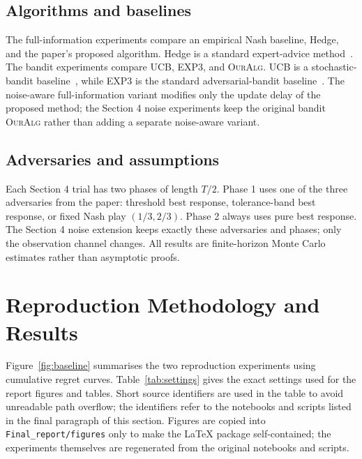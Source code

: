 \documentclass[a4paper,11pt]{article}
\theoremstyle{definition}
\newcommand{\OurAlg}{\textsc{OurAlg}}
\begin{document}
\subsection{Algorithms and baselines}

The full-information experiments compare an empirical Nash baseline, Hedge, and the paper's proposed algorithm. Hedge is a standard expert-advice method~\cite{freund1997decision,cesabianchi2006prediction}. The bandit experiments compare UCB, EXP3, and \OurAlg{}. UCB is a stochastic-bandit baseline~\cite{auer2002finite}, while EXP3 is the standard adversarial-bandit baseline~\cite{auer2002nonstochastic}. The noise-aware full-information variant modifies only the update delay of the proposed method; the Section 4 noise experiments keep the original bandit \OurAlg{} rather than adding a separate noise-aware variant.

\subsection{Adversaries and assumptions}

Each Section 4 trial has two phases of length $T/2$. Phase 1 uses one of the three adversaries from the paper: threshold best response, tolerance-band best response, or fixed Nash play $(1/3,2/3)$. Phase 2 always uses pure best response. The Section 4 noise extension keeps exactly these adversaries and phases; only the observation channel changes. All results are finite-horizon Monte Carlo estimates rather than asymptotic proofs.

\section{Reproduction Methodology and Results}

Figure~\ref{fig:baseline} summarises the two reproduction experiments using cumulative regret curves. Table~\ref{tab:settings} gives the exact settings used for the report figures and tables. Short source identifiers are used in the table to avoid unreadable path overflow; the identifiers refer to the notebooks and scripts listed in the final paragraph of this section. Figures are copied into \texttt{Final\_report/figures} only to make the LaTeX package self-contained; the experiments themselves are regenerated from the original notebooks and scripts.
\end{document}
